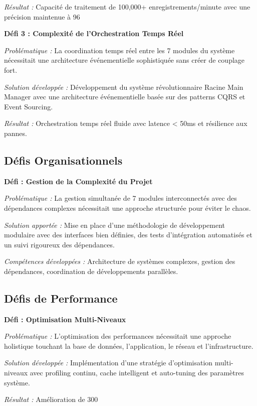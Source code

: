 \documentclass[a4paper,12pt]{article}
\begin{document}
\textit{Résultat :} Capacité de traitement de 100,000+ enregistrements/minute avec une précision maintenue à 96%

\textbf{Défi 3 : Complexité de l'Orchestration Temps Réel}

\textit{Problématique :} La coordination temps réel entre les 7 modules du système nécessitait une architecture événementielle sophistiquée sans créer de couplage fort.

\textit{Solution développée :} Développement du système révolutionnaire Racine Main Manager avec une architecture événementielle basée sur des patterns CQRS et Event Sourcing.

\textit{Résultat :} Orchestration temps réel fluide avec latence < 50ms et résilience aux pannes.

\subsection{Défis Organisationnels}

\textbf{Défi : Gestion de la Complexité du Projet}

\textit{Problématique :} La gestion simultanée de 7 modules interconnectés avec des dépendances complexes nécessitait une approche structurée pour éviter le chaos.

\textit{Solution apportée :} Mise en place d'une méthodologie de développement modulaire avec des interfaces bien définies, des tests d'intégration automatisés et un suivi rigoureux des dépendances.

\textit{Compétences développées :} Architecture de systèmes complexes, gestion des dépendances, coordination de développements parallèles.

\subsection{Défis de Performance}

\textbf{Défi : Optimisation Multi-Niveaux}

\textit{Problématique :} L'optimisation des performances nécessitait une approche holistique touchant la base de données, l'application, le réseau et l'infrastructure.

\textit{Solution développée :} Implémentation d'une stratégie d'optimisation multi-niveaux avec profiling continu, cache intelligent et auto-tuning des paramètres système.

\textit{Résultat :} Amélioration de 300%
\end{document}
